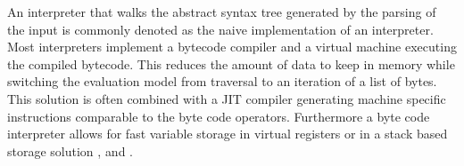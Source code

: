 An interpreter that walks the abstract syntax tree generated by the parsing of
the input is commonly denoted as the naive implementation of an interpreter.
Most interpreters implement a bytecode compiler and a virtual machine executing
the compiled bytecode. This reduces the amount of data to keep in memory while
switching the evaluation model from traversal to an iteration of a list of
bytes. This solution is often combined with a JIT compiler generating machine
specific instructions comparable to the byte code operators. Furthermore a byte
code interpreter allows for fast variable storage in virtual registers or in a
stack based storage solution \cite{mcilroy2016v8ignition}, \cite[1.
Introduction]{luaReference} and \cite[Introduction]{pythonDev}. 

